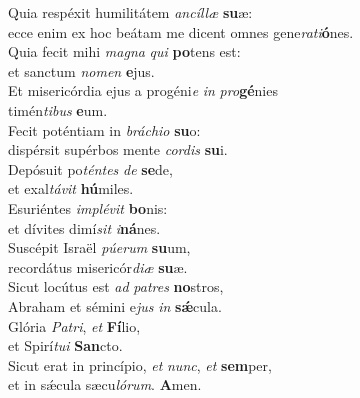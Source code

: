 \oddverse Quia respéxit humilitátem \textit{an}\textit{cíl}\textit{læ} \textbf{su}æ:~\*\\
\oddverse ecce enim ex hoc beátam me dicent omnes gene\textit{ra}\textit{ti}\textbf{ó}nes.\\
\evenverse Quia fecit mihi \textit{ma}\textit{gna} \textit{qui} \textbf{po}tens est:~\*\\
\evenverse et sanctum \textit{no}\textit{men} \textbf{e}jus.\\
\oddverse Et misericórdia ejus a progéni\textit{e} \textit{in} \textit{pro}\textbf{gé}nies~\*\\
\oddverse timén\textit{ti}\textit{bus} \textbf{e}um.\\
\evenverse Fecit poténtiam in \textit{brá}\textit{chi}\textit{o} \textbf{su}o:~\*\\
\evenverse dispérsit supérbos mente \textit{cor}\textit{dis} \textbf{su}i.\\
\oddverse Depósuit po\textit{tén}\textit{tes} \textit{de} \textbf{se}de,~\*\\
\oddverse et exal\textit{tá}\textit{vit} \textbf{hú}miles.\\
\evenverse Esuriéntes \textit{im}\textit{plé}\textit{vit} \textbf{bo}nis:~\*\\
\evenverse et dívites dimí\textit{sit} \textit{i}\textbf{ná}nes.\\
\oddverse Suscépit Israël \textit{pú}\textit{e}\textit{rum} \textbf{su}um,~\*\\
\oddverse recordátus misericór\textit{di}\textit{æ} \textbf{su}æ.\\
\evenverse Sicut locútus est \textit{ad} \textit{pa}\textit{tres} \textbf{no}stros,~\*\\
\evenverse Abraham et sémini e\textit{jus} \textit{in} \textbf{sǽ}cula.\\
\oddverse Glória \textit{Pa}\textit{tri}, \textit{et} \textbf{Fí}lio,~\*\\
\oddverse et Spirí\textit{tu}\textit{i} \textbf{San}cto.\\
\evenverse Sicut erat in princípio, \textit{et} \textit{nunc}, \textit{et} \textbf{sem}per,~\*\\
\evenverse et in sǽcula sæcu\textit{ló}\textit{rum}. \textbf{A}men.\\
